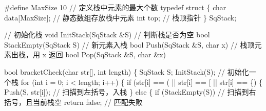 \documentclass[10.5pt,a4paper,oneside]{article}
\newenvironment{Shaded}{}{}
\newcommand{\CharTok}[1]{\textcolor[rgb]{0.63,0.19,0.43}{#1}}
\newcommand{\CommentTok}[1]{\textcolor[rgb]{0.18,0.55,0.23}{#1}}
\newcommand{\ControlFlowTok}[1]{\textcolor[rgb]{0.12,0.31,0.71}{#1}}
\newcommand{\DataTypeTok}[1]{\textcolor[rgb]{0.12,0.31,0.71}{#1}}
\newcommand{\DecValTok}[1]{\textcolor[rgb]{0.77,0.35,0.07}{#1}}
\newcommand{\KeywordTok}[1]{\textcolor[rgb]{0.12,0.31,0.71}{#1}}
\newcommand{\NormalTok}[1]{#1}
\newcommand{\OperatorTok}[1]{\textcolor[rgb]{0.20,0.20,0.20}{#1}}
\newcommand{\PreprocessorTok}[1]{\textcolor[rgb]{0.44,0.19,0.63}{#1}}
\begin{document}
\begin{Shaded}
\begin{Highlighting}[]
\PreprocessorTok{\#define MaxSize }\DecValTok{10}\PreprocessorTok{                  }\CommentTok{// 定义栈中元素的最大个数}
\KeywordTok{typedef} \KeywordTok{struct} \OperatorTok{\{}
    \DataTypeTok{char}\NormalTok{ data}\OperatorTok{[}\NormalTok{MaxSize}\OperatorTok{];}             \CommentTok{// 静态数组存放栈中元素}
    \DataTypeTok{int}\NormalTok{ top}\OperatorTok{;}                        \CommentTok{// 栈顶指针}
\OperatorTok{\}}\NormalTok{ SqStack}\OperatorTok{;}

\CommentTok{// 初始化栈}
\DataTypeTok{void}\NormalTok{ InitStack}\OperatorTok{(}\NormalTok{SqStack }\OperatorTok{\&}\NormalTok{S}\OperatorTok{)}
\CommentTok{// 判断栈是否为空}
\DataTypeTok{bool}\NormalTok{ StackEmpty}\OperatorTok{(}\NormalTok{SqStack S}\OperatorTok{)}
\CommentTok{// 新元素入栈}
\DataTypeTok{bool}\NormalTok{ Push}\OperatorTok{(}\NormalTok{SqStack }\OperatorTok{\&}\NormalTok{S}\OperatorTok{,} \DataTypeTok{char}\NormalTok{ x}\OperatorTok{)}
\CommentTok{// 栈顶元素出栈，用 x 返回}
\DataTypeTok{bool}\NormalTok{ Pop}\OperatorTok{(}\NormalTok{SqStack }\OperatorTok{\&}\NormalTok{S}\OperatorTok{,} \DataTypeTok{char} \OperatorTok{\&}\NormalTok{x}\OperatorTok{)}

\DataTypeTok{bool}\NormalTok{ bracketCheck}\OperatorTok{(}\DataTypeTok{char}\NormalTok{ str}\OperatorTok{[],} \DataTypeTok{int}\NormalTok{ length}\OperatorTok{)} \OperatorTok{\{}
\NormalTok{    SqStack S}\OperatorTok{;}
\NormalTok{    InitStack}\OperatorTok{(}\NormalTok{S}\OperatorTok{);}                   \CommentTok{// 初始化一个栈}
    \ControlFlowTok{for} \OperatorTok{(}\DataTypeTok{int}\NormalTok{ i }\OperatorTok{=} \DecValTok{0}\OperatorTok{;}\NormalTok{ i }\OperatorTok{\textless{}}\NormalTok{ length}\OperatorTok{;}\NormalTok{ i}\OperatorTok{++)} \OperatorTok{\{}
        \ControlFlowTok{if} \OperatorTok{(}\NormalTok{str}\OperatorTok{[}\NormalTok{i}\OperatorTok{]} \OperatorTok{==} \CharTok{\textquotesingle{}(\textquotesingle{}} \OperatorTok{||}\NormalTok{ str}\OperatorTok{[}\NormalTok{i}\OperatorTok{]} \OperatorTok{==} \CharTok{\textquotesingle{}[\textquotesingle{}} \OperatorTok{||}\NormalTok{ str}\OperatorTok{[}\NormalTok{i}\OperatorTok{]} \OperatorTok{==} \CharTok{\textquotesingle{}\{\textquotesingle{}}\OperatorTok{)} \OperatorTok{\{}
\NormalTok{            Push}\OperatorTok{(}\NormalTok{S}\OperatorTok{,}\NormalTok{ str}\OperatorTok{[}\NormalTok{i}\OperatorTok{]);}        \CommentTok{// 扫描到左括号，入栈}
        \OperatorTok{\}} \ControlFlowTok{else} \OperatorTok{\{}
            \ControlFlowTok{if} \OperatorTok{(}\NormalTok{StackEmpty}\OperatorTok{(}\NormalTok{S}\OperatorTok{))}      \CommentTok{// 扫描到右括号，且当前栈空}
                \ControlFlowTok{return} \KeywordTok{false}\OperatorTok{;}       \CommentTok{// 匹配失败}


\end{Highlighting}
\end{Shaded}
\end{document}
